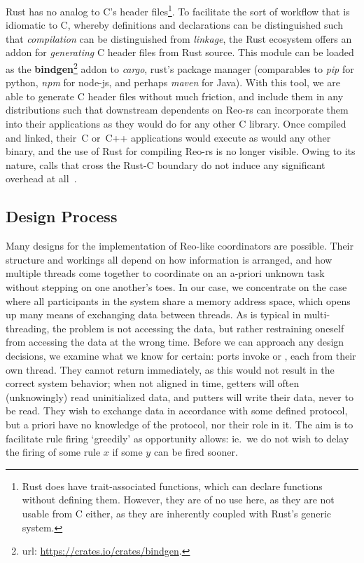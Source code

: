 Rust has no analog to C's header files\footnote{Rust does have trait-associated functions, which can declare functions without defining them. However, they are of no use here, as they are not usable from C either, as they are inherently coupled with Rust's generic system.}. To facilitate the sort of workflow that is idiomatic to C, whereby definitions and declarations can be distinguished such that \textit{compilation} can be distinguished from \textit{linkage}, the Rust ecosystem offers an addon for \textit{generating} C header files from Rust source. This module can be loaded as the \textbf{bindgen}\footnote{url: \url{https://crates.io/crates/bindgen}.} addon to \textit{cargo}, rust's package manager (comparables to \textit{pip} for python, \textit{npm} for node-js, and perhaps \textit{maven} for Java). With this tool, we are able to generate C header files without much friction, and include them in any distributions such that downstream dependents on Reo-rs can incorporate them into their applications as they would do for any other C library. Once compiled and linked, their~C or~C++ applications would execute as would any other binary, and the use of Rust for compiling Reo-rs is no longer visible. Owing to its nature, calls that cross the Rust-C boundary do not induce any significant overhead at all~\cite{klabnik2018rust}.

\subsection{Design Process}
\label{sec:chosen_design}
Many designs for the implementation of Reo-like coordinators are possible. Their structure and workings all depend on how information is arranged, and how multiple threads come together to coordinate on an a-priori unknown task without stepping on one another's toes. In our case, we concentrate on the case where all participants in the system share a memory address space, which opens up many means of exchanging data between threads. As is typical in multi-threading, the problem is not accessing the data, but rather restraining oneself from accessing the data at the wrong time. Before we can approach any design decisions, we examine what we know for certain: ports invoke  or , each from their own thread. They cannot return immediately, as this would not result in the correct system behavior; when not aligned in time, getters will often (unknowingly) read uninitialized data, and putters will write their data, never to be read. They wish to exchange data in accordance with some defined protocol, but a priori have no knowledge of the protocol, nor their role in it. The aim is to facilitate rule firing `greedily' as opportunity allows: ie.\ we do not wish to delay the firing of some rule $x$ if some $y$ can be fired sooner.

